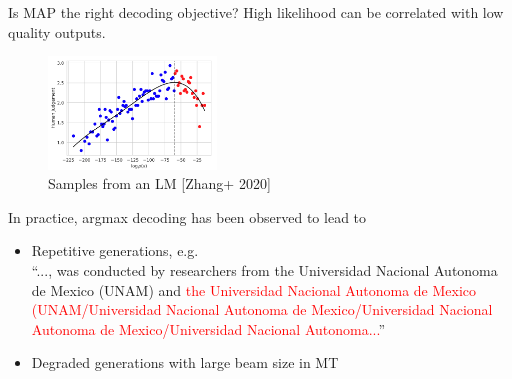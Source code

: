 \documentclass[usenames,dvipsnames,notes]{beamer}
\begin{document}
\begin{frame}
    {Is MAP the right decoding objective?}
    High likelihood can be correlated with low quality outputs.
    \vspace{-1em}
    \begin{figure}
        \includegraphics[height=3cm]{figures/likelihood-trap}
        \caption{Samples from an LM [Zhang+ 2020]}
    \end{figure}
    \vspace{-2em}

    In practice, argmax decoding has been observed to lead to\\
    \begin{itemize}
        \item Repetitive generations, e.g.\\
            {\footnotesize
                ``..., was conducted by researchers from the Universidad Nacional Autonoma de Mexico (UNAM) and \textcolor{red}{the Universidad Nacional Autonoma de Mexico (UNAM/Universidad Nacional Autonoma de Mexico/Universidad Nacional Autonoma de Mexico/Universidad Nacional Autonoma...}''}
        \item Degraded generations with large beam size in MT
    \end{itemize}
\end{frame}
\end{document}
